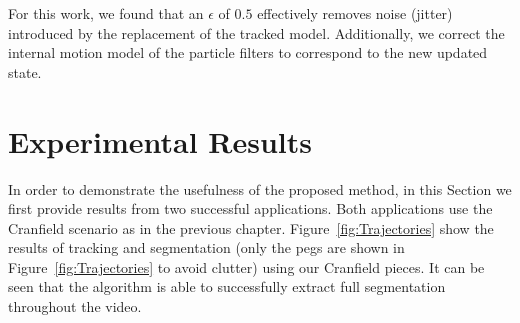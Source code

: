 For this work, we found that an $\epsilon$ of $0.5$ effectively removes noise (jitter) introduced by the replacement of the tracked model. Additionally, we correct the internal motion model of the particle filters to correspond to the new updated state.

\section{Experimental Results}
In order to demonstrate the usefulness of the proposed method, in this Section we first provide results from two successful applications. Both applications use the Cranfield scenario \cite{collins1984development} as in the previous chapter. Figure~\ref{fig:Trajectories} show the results of tracking and segmentation (only the pegs are shown in Figure~\ref{fig:Trajectories} to avoid clutter) using our Cranfield pieces. It can be seen that the algorithm is able to successfully extract full segmentation throughout the video.

